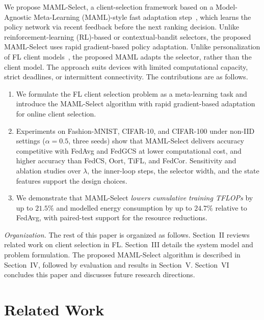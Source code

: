 \documentclass[journal]{IEEEtran}
\theoremstyle{remark}
\newcommand{\revision}[1]{#1}
\begin{document}
\revision{We propose MAML-Select, a client-selection framework based on a Model-Agnostic Meta-Learning (MAML)-style fast adaptation step~\cite{finn2017model}, which learns the policy network via recent feedback before the next ranking decision. Unlike reinforcement-learning (RL)-based or contextual-bandit selectors, the proposed MAML-Select uses rapid gradient-based policy adaptation. Unlike personalization of FL client models}~\cite{fallah2020personalized}, \revision{the proposed MAML adapts the selector, rather than the client model. The approach suits devices with limited computational capacity, strict deadlines, or intermittent connectivity.} The contributions are as follows.
\begin{enumerate}
\setlength{\itemsep}{0pt}
\setlength{\topsep}{1pt}
		\item We formulate the FL client selection problem as a meta-learning task and introduce the MAML-Select algorithm with \revision{rapid gradient-based} adaptation for online client selection.
        \item \revision{Experiments on Fashion-MNIST, CIFAR-10, and CIFAR-100 under non-IID settings ($\alpha = 0.5$, three seeds) show that MAML-Select delivers accuracy competitive with FedAvg and FedGCS at lower computational cost, and higher accuracy than FedCS, Oort, TiFL, and FedCor. Sensitivity and ablation studies over $\lambda$, the inner-loop steps, the selector width, and the state features support the design choices.}
		\item We demonstrate that MAML-Select \revision{\textit{lowers cumulative training TFLOPs} by up to $21.5\%$ and modelled energy consumption by up to $24.7\%$ relative to FedAvg, with paired-test support for the resource reductions}.
\end{enumerate}

\textit{Organization.} The rest of this paper is organized as follows. Section~II reviews related work on client selection in FL. Section~III details the system model and problem formulation. The proposed MAML-Select algorithm is described in Section~IV, followed by evaluation and results in Section~V. Section~VI concludes this paper and discusses future research directions.

\section{Related Work}
\end{document}
